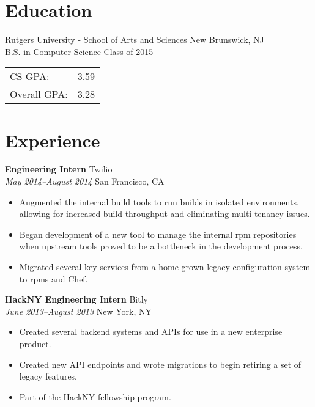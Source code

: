 \documentclass[centered,overlapped]{res}
\begin{document}

\address{153 Riveredge Road \\ Tinton Falls, NJ 07724}
\address{josh@jmatthews.us \\ github.com/jmatth}

\begin{resume}


\section{Education}

Rutgers University - School of Arts and Sciences \hfill New Brunswick, NJ\\
B.S. in Computer Science \hfill Class of 2015 \\
\begin{tabular}{l l}
	CS GPA: & 3.59 \\
	Overall GPA: & 3.28 \\
\end{tabular}

\section{Experience}

{\bf Engineering Intern} \hfill Twilio\\
\textit{May 2014--August 2014} \hfill San Francisco, CA
\begin{itemize} \itemsep -2pt %
    \item Augmented the internal build tools to run builds in isolated
      environments, allowing for increased build throughput and eliminating
      multi-tenancy issues.
    \item Began development of a new tool to manage the internal rpm
      repositories when upstream tools proved to be a bottleneck in the
      development process.
    \item Migrated several key services from a home-grown legacy configuration
        system to rpms and Chef.
\end{itemize}

{\bf HackNY Engineering Intern} \hfill Bitly\\
\textit{June 2013--August 2013} \hfill New York, NY
\begin{itemize} \itemsep -2pt %
	\item Created several backend systems and APIs for use in a new enterprise
        product.
    \item Created new API endpoints and wrote migrations to begin retiring a set
        of legacy features.
    \item Part of the HackNY fellowship program.
\end{itemize}


\end{resume}
\end{document}
